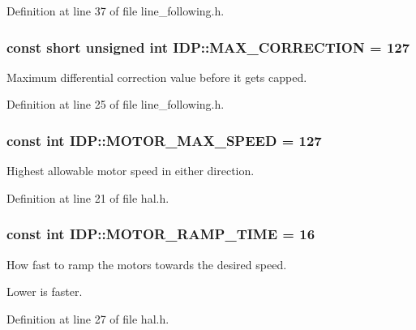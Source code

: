 Definition at line 37 of file line\_\-following.h.

\hypertarget{namespaceIDP_a246919caaacabcb0399802d542d8330b}{
\subsubsection[{MAX\_\-CORRECTION}]{\setlength{\rightskip}{0pt plus 5cm}const short unsigned int {\bf IDP::MAX\_\-CORRECTION} = 127}}
\label{namespaceIDP_a246919caaacabcb0399802d542d8330b}


Maximum differential correction value before it gets capped. 



Definition at line 25 of file line\_\-following.h.

\hypertarget{namespaceIDP_a4ead0b21ad2c507b542445695182d4cd}{
\subsubsection[{MOTOR\_\-MAX\_\-SPEED}]{\setlength{\rightskip}{0pt plus 5cm}const int {\bf IDP::MOTOR\_\-MAX\_\-SPEED} = 127}}
\label{namespaceIDP_a4ead0b21ad2c507b542445695182d4cd}


Highest allowable motor speed in either direction. 



Definition at line 21 of file hal.h.

\hypertarget{namespaceIDP_ab3a00a6cc8a6dba271e38d337daf4703}{
\subsubsection[{MOTOR\_\-RAMP\_\-TIME}]{\setlength{\rightskip}{0pt plus 5cm}const int {\bf IDP::MOTOR\_\-RAMP\_\-TIME} = 16}}
\label{namespaceIDP_ab3a00a6cc8a6dba271e38d337daf4703}


How fast to ramp the motors towards the desired speed. 

Lower is faster. 

Definition at line 27 of file hal.h.

